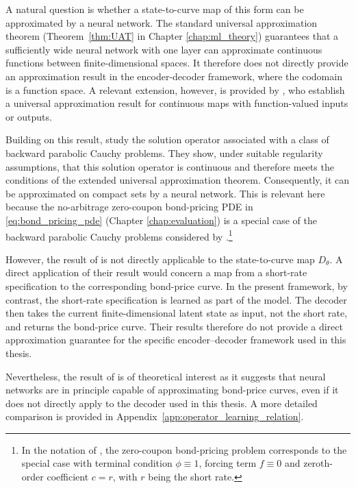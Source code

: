 A natural question is whether a state-to-curve map of this form can be approximated by a neural network. The standard universal approximation theorem (Theorem~\ref{thm:UAT} in Chapter \ref{chap:ml_theory}) guarantees that a sufficiently wide neural network with one layer can approximate continuous functions between finite-dimensional spaces. It therefore does not directly provide an approximation result in the encoder-decoder framework, where the codomain is a function space. A relevant extension, however, is provided by \citet{Benth2023}, who establish a universal approximation result for continuous maps with function-valued inputs or outputs.

Building on this result, \citet{Benth2024} study the solution operator associated with a class of backward parabolic Cauchy problems. They show, under suitable regularity assumptions, that this solution operator is continuous and therefore meets the conditions of the extended universal approximation theorem. Consequently, it can be approximated on compact sets by a neural network. This is relevant here because the no-arbitrage zero-coupon bond-pricing PDE in \eqref{eq:bond_pricing_pde} (Chapter \ref{chap:evaluation}) is a special case of the backward parabolic Cauchy problems considered by \citet{Benth2024}.\footnote{In the notation of \citet{Benth2024}, the zero-coupon bond-pricing problem corresponds to the special case with terminal condition \(\phi\equiv 1\), forcing term \(f\equiv 0\) and zeroth-order coefficient $c=r$, with $r$ being the short rate.} 

However, the result of \citet{Benth2024} is not directly applicable to the state-to-curve map $D_\theta$. A direct application of their result would concern a map from a short-rate specification to the corresponding bond-price curve. In the present framework, by contrast, the short-rate specification is learned as part of the model. The decoder then takes the current finite-dimensional latent state as input, not the short rate, and returns the bond-price curve. Their results therefore do not provide a direct approximation guarantee for the specific encoder--decoder framework used in this thesis.

Nevertheless, the result of \citet{Benth2024} is of theoretical interest as it suggests that neural networks are in principle capable of approximating bond-price curves, even if it does not directly apply to the decoder used in this thesis. A more detailed comparison is provided in Appendix~\ref{app:operator_learning_relation}.

